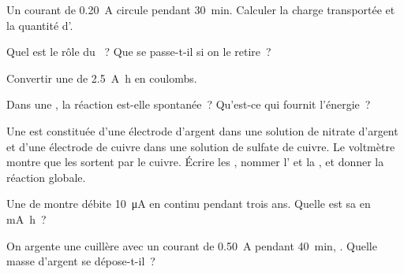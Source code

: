 \begin{exercise}[$\star$]\label{exo:g12:cells-and-electrolysis:2}
Un courant de \qty{0.20}{A} circule pendant \qty{30}{min}. Calculer la
charge transportée et la quantité d'.
\end{exercise}

\begin{exercise}[$\star$]\label{exo:g12:cells-and-electrolysis:3}
Quel est le rôle du ~? Que se passe-t-il si on le retire~?
\end{exercise}

\begin{exercise}[$\star$]\label{exo:g12:cells-and-electrolysis:4}
Convertir une  de \qty{2.5}{A.h} en coulombs.
\end{exercise}

\begin{exercise}[$\star$]\label{exo:g12:cells-and-electrolysis:5}
Dans une , la réaction est-elle spontanée~? Qu'est-ce qui
fournit l'énergie~?
\end{exercise}

\begin{exercise}[$\star\star$]\label{exo:g12:cells-and-electrolysis:6}
Une  est constituée d'une électrode d'argent dans une solution de
nitrate d'argent et d'une électrode de cuivre dans une solution de
sulfate de cuivre. Le voltmètre montre que les  sortent par le
cuivre. Écrire les , nommer l' et la , et
donner la réaction globale.
\end{exercise}

\begin{exercise}[$\star\star$]\label{exo:g12:cells-and-electrolysis:7}
Une  de montre débite \qty{10}{\micro A} en continu pendant trois
ans. Quelle est sa  en \si{mA.h}~?
\end{exercise}

\begin{exercise}[$\star\star$]\label{exo:g12:cells-and-electrolysis:8}
On argente une cuillère avec un courant de \qty{0.50}{A} pendant
\qty{40}{min}, . Quelle masse d'argent se dépose-t-il~?
\end{exercise}

